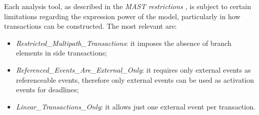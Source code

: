Each analysis tool, as described in the \textit{MAST restrictions}
\cite{restrictionsMAST}, is subject to certain limitations regarding the
expression power of the model, particularly in how transactions can be
constructed. The most relevant are: 
\begin{itemize}
    \item\textit{Restricted\_Multipath\_Transactions}: it imposes the absence of
    branch elements in side transactions;
    \item \textit{Referenced\_Events\_Are\_External\_Only}: it requires only
    external events as referenceable events, therefore only external events can
    be used as activation events for deadlines; 
    \item\textit{Linear\_Transactions\_Only}: it allows just one external event
    per transaction. 
\end{itemize}